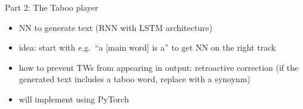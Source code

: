 \documentclass[11pt]{beamer}
\begin{document}


\begin{frame}{Part 2: The Taboo player}
	
	\begin{itemize}
		\item NN to generate text (RNN with LSTM architecture)
		\item idea: start with e.g.\ ``a [main word] is a'' to get NN on the right track
		\item how to prevent TWs from appearing in output: retroactive correction (if the generated text includes a taboo word, replace with a synoynm)
		\item will implement using PyTorch
	\end{itemize}
	
\end{frame}


%
%
%

\end{document}
